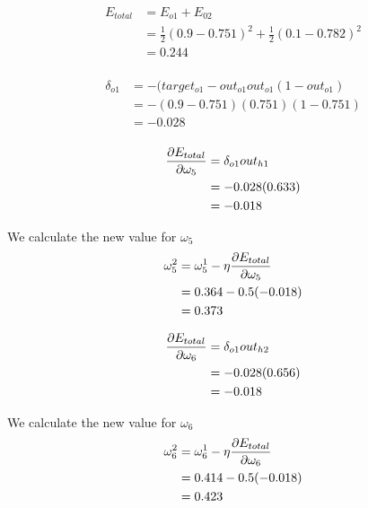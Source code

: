 \documentclass[10pt,a4paper]{article}
\begin{document}
\begin{equation}
\begin{split}
E_{total} &= E_{o1} + E_{02} \\
          &= \frac{1}{2}(0.9-0.751)^2 + \frac{1}{2}(0.1 - 0.782)^2 \\
          &= 0.244 \\
\end{split}
\end{equation}

\begin{equation}
\begin{split}
\delta_{o1} &= -(target_{o1} -out_{o1}out_{o1}(1-out_{o1})\\
            &= -(0.9-0.751)(0.751)(1-0.751)\\
            &= -0.028\\
\end{split}
\end{equation}

\begin{equation}
\begin{split}
\pdv{E_{total}}{\omega_5} &= \delta_{o1}out_{h1}\\
                          &= -0.028(0.633)\\
                          &= -0.018\\
\end{split}
\end{equation}

We calculate the new value for $\omega_5$
\begin{equation}
\begin{split}
\omega_5^2 &= \omega_5^1 - \eta\pdv{E_{total}}{\omega_5}\\
           &= 0.364 -0.5(-0.018)\\
           &= 0.373\\
\end{split}
\end{equation}

\begin{equation}
\begin{split}
\pdv{E_{total}}{\omega_6} &= \delta_{o1}out_{h2}\\
                          &= -0.028(0.656)\\
                          &= -0.018\\
\end{split}
\end{equation}

We calculate the new value for $\omega_6$
\begin{equation}
\begin{split}
\omega_6^2 &= \omega_6^1 - \eta\pdv{E_{total}}{\omega_6}\\
           &= 0.414 -0.5(-0.018)\\
           &= 0.423\\
\end{split}
\end{equation}
\end{document}
